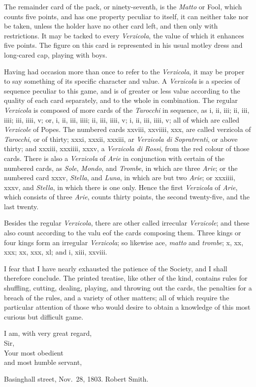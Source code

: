 \documentclass[11pt,a5paper]{article}
\begin{document}
The remainder card of the pack, or ninety-seventh, is the \textit{Matto} or Fool, which counts five points, and has one property peculiar to itself, it can neither take nor be taken, unless the holder have no other card left, and then only with restrictions.
It may be tacked to every \textit{Verzicola}, the value of which it enhances five points.
The figure on this card is represented in his usual motley dress and long-cared cap, playing with boys.

Having had occasion more than once to refer to the \textit{Verzicola}, it may be proper to say something of its specific character and value.
A \textit{Verzicola} is a species of sequence peculiar to this game, and is of greater or less value according to the quality of each card separately, and to the whole in combination.
The regular \textit{Verzicola} is composed of more cards of the \textit{Tarocchi} in sequence, as i, ii, iii; ii, iii, iiii; iii, iiii, v; or, i, ii, iii, iiii; ii, iii, iiii, v; i, ii, iii, iiii, v; all of which are called \textit{Verzicole} of Popes.
The numbered cards xxviii, xxviiii, xxx, are called verzicola of \textit{Tarocchi}, or of thirty; xxxi, xxxii, xxxiii, ar \textit{Verzicola di Sopratrenti}, or above thirty; and xxxiii, xxxiiii, xxxv, a \textit{Verzicola di Rossi}, from the red colour of those cards.
There is also a \textit{Verzicola} of \textit{Arie} in conjunction with certain of the numbered cards, as \textit{Sole}, \textit{Mondo}, and \textit{Trombe}, in which are three \textit{Arie}; or the numbered card xxxv, \textit{Stella}, and \textit{Luna}, in which are but two \textit{Arie}; or xxxiiii, xxxv, and \textit{Stella}, in which there is one only.
Hence the first \textit{Verzicola} of \textit{Arie}, which consists of three \textit{Arie}, counts thirty points, the second twenty-five, and the last twenty.

Besides the regular \textit{Verzicola}, there are other called irrecular \textit{Verzicole}; and these also count according to the valu eof the cards composing them.
Three kings or four kings form an irregular \textit{Verzicola}; so likewise ace, \textit{matto} and \textit{trombe}; x, xx, xxx; xx, xxx, xl; and i, xiii, xxviii.

I fear that I have nearly exhausted the patience of the Society, and I shall therefore conclude.
The printed treatise, like other of the kind, contains rules for shuffling, cutting, dealing, playing, and throwing out the cards, the penalties for a breach of the rules, and a variety of other matters; all of which require the particular attention of those who would desire to obtain a knowledge of this most curious but difficult game.

{\centering
  
I am, with very great regard, \\
Sir,\\
Your most obedient\\
\hspace{12em}and most humble servant,

}

\noindent Basinghall street, Nov.\ 28, 1803. \hfill Robert Smith.
\end{document}
